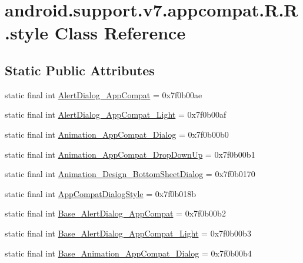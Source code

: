 \hypertarget{classandroid_1_1support_1_1v7_1_1appcompat_1_1_r_1_1style}{
\section{android.support.v7.appcompat.R.R.style Class Reference}
\label{classandroid_1_1support_1_1v7_1_1appcompat_1_1_r_1_1style}
}
\subsection*{Static Public Attributes}
\begin{CompactItemize}
\item 
static final int \hyperlink{classandroid_1_1support_1_1v7_1_1appcompat_1_1_r_1_1style_77e988201d0eaf0d704e3ef2d5e104ef}{AlertDialog\_\-AppCompat} = 0x7f0b00ae
\item 
static final int \hyperlink{classandroid_1_1support_1_1v7_1_1appcompat_1_1_r_1_1style_10db1970e04052925e533972aad9e113}{AlertDialog\_\-AppCompat\_\-Light} = 0x7f0b00af
\item 
static final int \hyperlink{classandroid_1_1support_1_1v7_1_1appcompat_1_1_r_1_1style_03bd5698f7856a68c6f791ebf6ba2e85}{Animation\_\-AppCompat\_\-Dialog} = 0x7f0b00b0
\item 
static final int \hyperlink{classandroid_1_1support_1_1v7_1_1appcompat_1_1_r_1_1style_bee72f7cbebc9637b063e57414f8663c}{Animation\_\-AppCompat\_\-DropDownUp} = 0x7f0b00b1
\item 
static final int \hyperlink{classandroid_1_1support_1_1v7_1_1appcompat_1_1_r_1_1style_3c7682f73220176bd62982764037292b}{Animation\_\-Design\_\-BottomSheetDialog} = 0x7f0b0170
\item 
static final int \hyperlink{classandroid_1_1support_1_1v7_1_1appcompat_1_1_r_1_1style_e9d322b8e10e531bb7b938639c85d699}{AppCompatDialogStyle} = 0x7f0b018b
\item 
static final int \hyperlink{classandroid_1_1support_1_1v7_1_1appcompat_1_1_r_1_1style_be930814c2ee9c8dccd73016fc602005}{Base\_\-AlertDialog\_\-AppCompat} = 0x7f0b00b2
\item 
static final int \hyperlink{classandroid_1_1support_1_1v7_1_1appcompat_1_1_r_1_1style_760dcd6d4cbd2fff581afce8a91d42e2}{Base\_\-AlertDialog\_\-AppCompat\_\-Light} = 0x7f0b00b3
\item 
static final int \hyperlink{classandroid_1_1support_1_1v7_1_1appcompat_1_1_r_1_1style_a9296aca76261b5d5c95a3878ca6597d}{Base\_\-Animation\_\-AppCompat\_\-Dialog} = 0x7f0b00b4

\end{CompactItemize}
